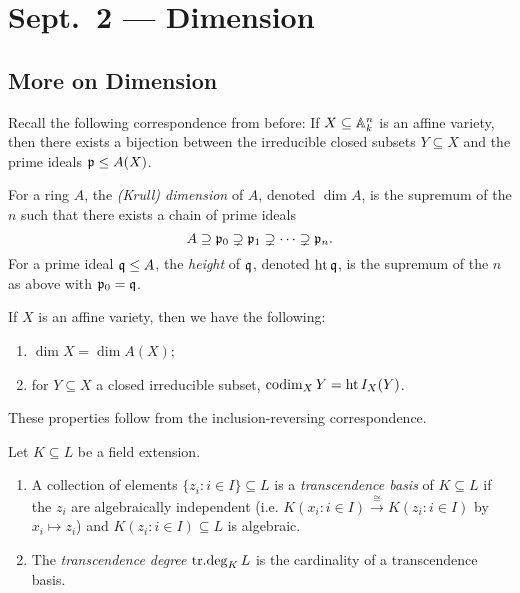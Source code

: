\chapter{Sept.~2 --- Dimension}

\section{More on Dimension}

\begin{remark}
  Recall the following correspondence
  from before:
  If $X \subseteq \mathbb{A}_k^n$ is an
  affine variety, then there exists a
  bijection between the
  irreducible closed subsets
  $Y \subseteq X$ and the prime ideals
  $\mathfrak{p} \le A(X)$.
\end{remark}

\begin{definition}
  For a ring $A$, the \emph{(Krull) dimension}
  of $A$, denoted $\dim A$, is the
  supremum of the $n$ such that there
  exists a chain of prime ideals
  \[
    A \supseteq \mathfrak{p}_0 \supsetneq \mathfrak{p}_1 \supsetneq \cdots \supsetneq \mathfrak{p}_n.
  \]
  For a prime ideal $\mathfrak{q} \le A$, the
  \emph{height} of $\mathfrak{q}$, denoted
  $\operatorname{ht} \mathfrak{q}$, is the supremum of the
  $n$ as above with $\mathfrak{p}_0 = \mathfrak{q}$.
\end{definition}

\begin{remark}
  If $X$ is an affine variety, then
  we have the following:
  \begin{enumerate}
    \item $\dim X = \dim A(X)$;
    \item for $Y \subseteq X$ a
      closed irreducible subset,
      $\operatorname{codim}_X Y = \operatorname{ht} I_X(Y)$.
  \end{enumerate}
  These properties follow from the
  inclusion-reversing correspondence.
\end{remark}

\begin{definition}
  Let $K \subseteq L$ be a field extension.
  \begin{enumerate}
    \item A collection of elements
      $\{z_i : i \in I\} \subseteq L$
      is a \emph{transcendence basis}
      of $K \subseteq L$ if
      the $z_i$ are algebraically
      independent (i.e. $K(x_i : i \in I) \xrightarrow{\cong} K(z_i : i \in I)$ by $x_i \mapsto z_i$)
      and $K(z_i : i \in I) \subseteq L$
      is algebraic.
    \item The \emph{transcendence degree}
      $\operatorname{tr{.}deg}_K L$ is the cardinality
      of a transcendence basis.
  \end{enumerate}
\end{definition}

